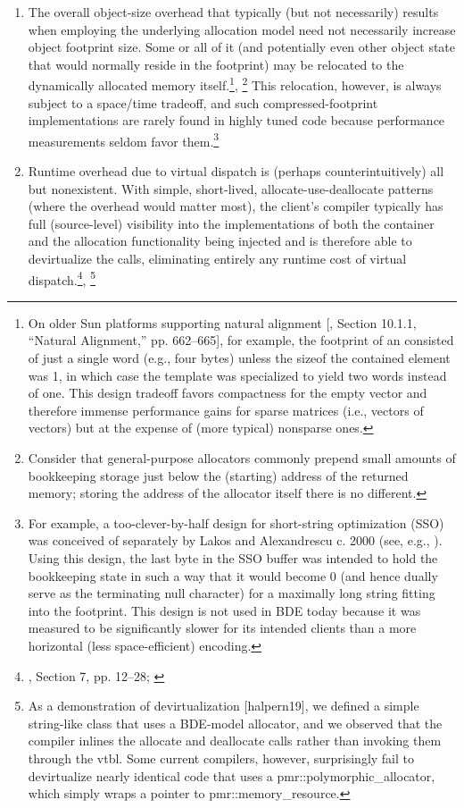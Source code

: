 \begin{enumerate}
\item The overall object-size overhead that typically (but not necessarily) results
when employing the underlying allocation model need not necessarily increase
object footprint size. Some or all of it (and potentially even other object state
that would normally reside in the footprint) may be relocated to the
dynamically allocated memory itself.\footnote{On older Sun platforms supporting natural alignment [\cite{lakos96}, Section 10.1.1, “Natural
Alignment,” pp. 662–665], for example, the footprint of an  consisted of just a single
word (e.g., four bytes) unless the sizeof the contained element was 1, in which case the template
was specialized to yield two words instead of one. This design tradeoff favors compactness for the
empty vector and therefore immense performance gains for sparse matrices (i.e., vectors of vectors)
but at the expense of (more typical) nonsparse ones.}, \footnote{Consider that general-purpose
allocators commonly prepend small amounts of bookkeeping
storage just below the (starting) address of the returned memory; storing the address of the allocator
itself there is no different.} This relocation, however, is always
subject to a space/time tradeoff, and such compressed-footprint
implementations are rarely found in highly tuned code because performance
measurements seldom favor them.\footnote{For example, a too-clever-by-half design for short-string optimization (SSO) was conceived of
separately by Lakos and Alexandrescu c. 2000 (see, e.g., \cite{alexandrescu04}). Using this design, the last
byte in the SSO buffer was intended to hold the bookkeeping state in such a way that it would
become 0 (and hence dually serve as the terminating null character) for a maximally long string
fitting into the footprint. This design is not used in BDE today because it was measured to be
significantly slower for its intended clients than a more horizontal (less space-efficient) encoding.}


\item Runtime overhead due to virtual dispatch is (perhaps counterintuitively) all
but nonexistent. With simple, short-lived, allocate-use-deallocate patterns
(where the overhead would matter most), the client’s compiler typically has
full (source-level) visibility into the implementations of both the container and
the allocation functionality being injected and is therefore able to devirtualize
the calls, eliminating entirely any runtime cost of virtual
dispatch.\footnote{\cite{lakos16}, Section 7, pp. 12–28; \cite{bleaney16}}, \footnote{As a
demonstration of devirtualization [halpern19], we defined a simple string-like class that uses
a BDE-model allocator, and we observed that the compiler inlines the allocate and deallocate
calls rather than invoking them through the vtbl. Some current compilers, however, surprisingly fail
to devirtualize nearly identical code that uses a pmr::polymorphic_allocator, which simply wraps
a pointer to pmr::memory_resource.}


\end{enumerate}
